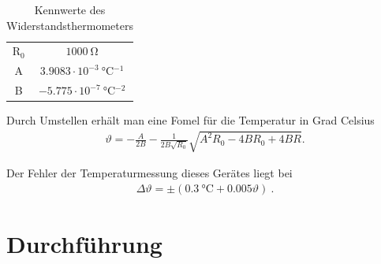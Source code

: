 \documentclass[12pt,a4paper,titlepage,headinclude,bibtotoc]{scrartcl}
\begin{document}
\begin{table}[!htb]
	\centering
	\begin{tabular}{|c|c|}
		\hline
		R$_0$ & $1000 ~ \si{\ohm}$\\
		A   & $3.9083 \cdot 10^{-3} ~ \si{\celsius^{-1}}$\\
		B   & $-5.775 \cdot 10^{-7} ~ \si{\celsius^{-2}}$\\
		\hline
	\end{tabular}
	\caption{Kennwerte des Widerstandsthermometers}
	\label{tab:Pt1000}
\end{table}

Durch Umstellen erhält man eine Fomel für die Temperatur in Grad Celsius
\begin{align}
 \vartheta = -\frac{A}{2 B} - \frac{1}{2 B \sqrt{R_0}} \sqrt{A^2 R_0  - 4 B R_0 + 4 B R    } .
\end{align}

Der Fehler der Temperaturmessung dieses Gerätes liegt bei
\begin{align}
	\Delta\vartheta=\pm (0.3~\si{\celsius}+0.005\vartheta)~.
	\label{eq:Pt1000_fehler}
\end{align}


\section{Durchführung}
\label{sec:durchfuehrung}
\end{document}

